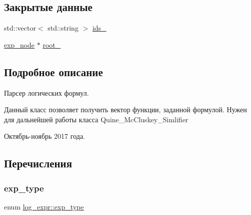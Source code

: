 \subsection*{Закрытые данные}
\begin{DoxyCompactItemize}
\item 
std\+::vector$<$ std\+::string $>$ \hyperlink{classlog__expr_a9390f80da7f2b5ca3a7023ec76ecf2cd}{ids\+\_\+}
\item 
\hyperlink{structlog__expr_1_1exp__node}{exp\+\_\+node} $\ast$ \hyperlink{classlog__expr_a3497df2d3c87e5358c39329fcd9c1853}{root\+\_\+}
\end{DoxyCompactItemize}


\subsection{Подробное описание}
Парсер логических формул. 

Данный класс позволяет получить вектор функции, заданной формулой. Нужен для дальнейшей работы класса Quine\+\_\+\+Mc\+Cluskey\+\_\+\+Simlifier

Октябрь-\/ноябрь 2017 года. 

\subsection{Перечисления}
\mbox{\label{classlog__expr_abfd63d60441373c4017ef250008102d9}} 
\subsubsection{\texorpdfstring{exp\+\_\+type}{exp\_type}}
{\footnotesize\ttfamily enum \hyperlink{classlog__expr_abfd63d60441373c4017ef250008102d9}{log\+\_\+expr\+::exp\+\_\+type}\hspace{0.3cm}{\ttfamily [private]}}

